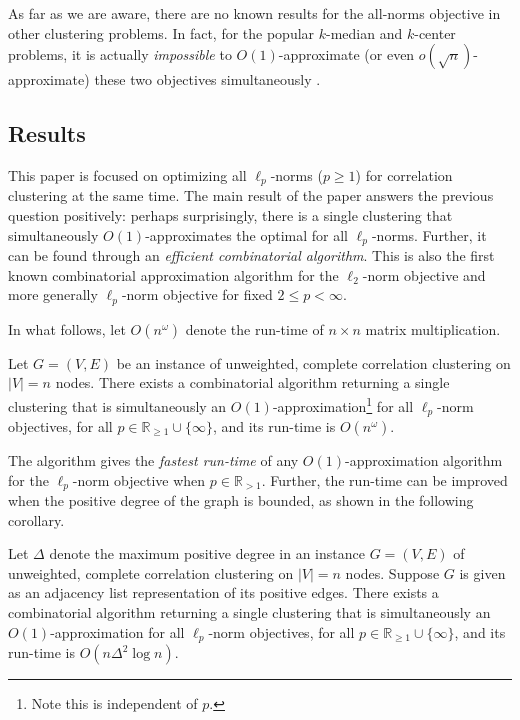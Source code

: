 As far as we are aware, there are no known results for the all-norms objective in other clustering problems. In fact, for the popular $k$-median and $k$-center problems, it is actually \textit{impossible} to $O(1)$-approximate (or even $o(\sqrt{n})$-approximate) these two objectives simultaneously \cite{2018bicriteria}.




\subsection{Results}
This paper is focused on optimizing all $\ell_p$-norms ($p \geq 1$) for correlation clustering at the same time.  The main result of the paper answers the previous question positively: perhaps surprisingly, there is a single clustering that simultaneously $O(1)$-approximates the optimal for all $\ell_p$-norms. Further, it can be found through an \emph{efficient combinatorial algorithm}.   This is also the first known combinatorial approximation algorithm for the $\ell_2$-norm objective and more generally $\ell_p$-norm objective for fixed $2 \leq p < \infty$.  

In what follows, let $O(n^\omega)$ denote the run-time of $n \times n$ matrix multiplication.  

\begin{theorem}\label{thm: main-acm}
Let $G=(V,E)$ be an instance of unweighted, complete correlation clustering on $|V|=n$ nodes. There exists a combinatorial algorithm returning a single clustering that is simultaneously an $O(1)$-approximation\footnote{Note this is independent of $p$.} for all $\ell_p$-norm objectives, for all $p\in \mathbb{R}_{\geq 1} \cup \{\infty\}$, and its run-time is $O(n^\omega)$.
\end{theorem}

The algorithm gives the \emph{fastest run-time} of any $O(1)$-approximation algorithm for the $\ell_p$-norm objective when $p  \in \mathbb{R}_{>1}$.
Further, the run-time can be improved  when the positive degree of the graph is bounded, as shown in the following corollary. 

\begin{corollary}\label{cor: main-acm-sparse}
Let $\Delta$ denote the maximum positive degree in an instance $G=(V,E)$ of unweighted, complete correlation clustering on $|V|=n$ nodes. Suppose $G$ is given as an adjacency list representation of its positive edges. There exists a combinatorial algorithm returning a single clustering that is simultaneously an $O(1)$-approximation for all $\ell_p$-norm objectives, for all $p\in \mathbb{R}_{\geq 1} \cup \{\infty\}$, and its run-time is $O(n\Delta^2 \log n)$.
\end{corollary}

